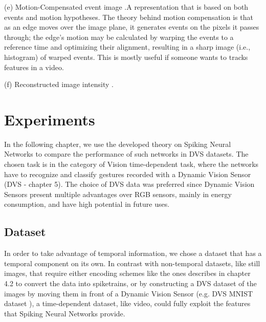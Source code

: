 \documentclass[12pt]{report}
\begin{document}
(e) Motion-Compensated event image \cite{Gallego2020} .A representation that is based on both events and motion hypotheses. The theory behind motion compensation is that as an edge moves over the image plane, it generates events on the pixels it passes through; the edge's motion may be calculated by warping the events to a reference time and optimizing their alignment, resulting in a sharp image (i.e., histogram) of warped events. This is mostly useful if someone wants to tracks features in a video.

(f) Reconstructed image intensity \cite{rebecq2019}.


\chapter{Experiments}

In the following chapter, we use the developed theory on Spiking Neural Networks to compare the performance of such networks in DVS datasets. The chosen task is in the category of Vision time-dependent task, where the networks have to recognize and classify gestures recorded with a Dynamic Vision Sensor (DVS - chapter 5). The choice of DVS data was preferred since Dynamic Vision Sensors present multiple advantages over RGB sensors, mainly in energy consumption, and have high potential in future uses.%

\section{Dataset}

In order to take advantage of temporal information, we chose a dataset that has a temporal component on its own. In contrast with non-temporal datasets, like still images, that require either encoding schemes like the ones describes in chapter 4.2 to convert the data into spiketrains, or by constructing a DVS dataset of the images by moving them in front of a Dynamic Vision Sensor (e.g. DVS MNIST dataset \cite{Gotarredona2015}), a time-dependent dataset, like video, could fully exploit the features that Spiking Neural Networks provide.
\end{document}

